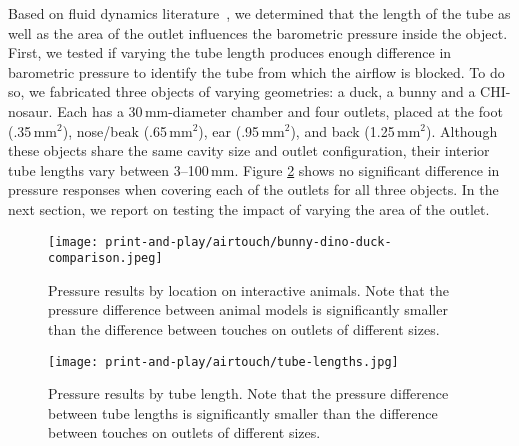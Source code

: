 		    Based on fluid dynamics literature~\cite{Brown:2002it}, we determined
		    that the length of the tube as well as the area of the outlet influences
		    the barometric pressure inside the object. First, we tested if varying
		    the tube length produces enough difference in barometric pressure to
		    identify the tube from which the airflow is blocked. To do so, we
		    fabricated three objects of varying geometries: a duck, a bunny and a
		    CHI-nosaur. Each has a 30\,mm-diameter chamber and four outlets, placed
		    at the foot (.35\,mm$^2$), nose/beak (.65\,mm$^2$), ear (.95\,mm$^2$),
		    and back (1.25\,mm$^2$). Although these objects share the same cavity
		    size and outlet configuration, their interior tube lengths vary between
		    3--100\,mm. Figure \ref{fig:tube-lengths} shows no significant
		    difference in pressure responses when covering each of the outlets for
		    all three objects. In the next section, we report on testing the impact
		    of varying the area of the outlet.
		    
		    \begin{figure}
					\centering
					\texttt{[image: print-and-play/airtouch/bunny-dino-duck-comparison.jpeg]}
					\caption{Pressure results by location on interactive animals. Note
						that the pressure difference between animal models is significantly
						smaller than the difference between touches on outlets of different
						sizes.}
					\label{fig:tube-lengths}
		    \end{figure}

		    \begin{figure}[h]
					\centering
					\texttt{[image: print-and-play/airtouch/tube-lengths.jpg]}
					\caption{Pressure results by tube length. Note that the pressure
						difference between tube lengths is significantly smaller than the
						difference between touches on outlets of different sizes.}
					\label{fig:tube-lengths}
		    \end{figure}
		    
